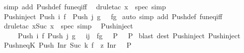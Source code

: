 \begin{isabellebody}
\isamarkupfalse%
\ {\isacharparenleft}simp\ add{\isacharcolon}\ Push{\isacharunderscore}def\ fun{\isacharunderscore}eq{\isacharunderscore}iff{\isacharparenright}\ \isanewline
{}\isamarkupfalse%
\ {\isacharparenleft}drule{\isacharunderscore}tac\ x{\isacharequal}{}\ \ spec{\isacharcomma}\ simp{\isacharparenright}\ \isanewline
{}\isamarkupfalse%
%
\endisatagproof
{\isafoldproof}%
%
\isadelimproof
\isanewline
%
\endisadelimproof
\isanewline
{}\isamarkupfalse%
\ Push{\isacharunderscore}inject{}{\isacharcolon}\ {\isachardoublequoteopen}Push\ i\ f\ {\isacharequal}\ Push\ j\ g\ \ {\isacharequal}{\isacharequal}{\isachargreater}\ f{\isacharequal}g{\isachardoublequoteclose}\isanewline
%
\isadelimproof
%
\endisadelimproof
%
\isatagproof
{}\isamarkupfalse%
\ {\isacharparenleft}auto\ simp\ add{\isacharcolon}\ Push{\isacharunderscore}def\ fun{\isacharunderscore}eq{\isacharunderscore}iff{\isacharparenright}\ \isanewline
{}\isamarkupfalse%
\ {\isacharparenleft}drule{\isacharunderscore}tac\ x{\isacharequal}{\isachardoublequoteopen}Suc\ x{\isachardoublequoteclose}\ \ spec{\isacharcomma}\ simp{\isacharparenright}\ \isanewline
{}\isamarkupfalse%
%
\endisatagproof
{\isafoldproof}%
%
\isadelimproof
\isanewline
%
\endisadelimproof
\isanewline
{}\isamarkupfalse%
\ Push{\isacharunderscore}inject{\isacharcolon}\isanewline
\ \ \ \ {\isachardoublequoteopen}{\isacharbrackleft}{\isacharbar}\ Push\ i\ f\ {\isacharequal}Push\ j\ g{\isacharsemicolon}\ \ {\isacharbrackleft}{\isacharbar}\ i{\isacharequal}j{\isacharsemicolon}\ \ f{\isacharequal}g\ {\isacharbar}{\isacharbrackright}\ {\isacharequal}{\isacharequal}{\isachargreater}\ P\ {\isacharbar}{\isacharbrackright}\ {\isacharequal}{\isacharequal}{\isachargreater}\ P{\isachardoublequoteclose}\isanewline
%
\isadelimproof
%
\endisadelimproof
%
\isatagproof
{}\isamarkupfalse%
\ {\isacharparenleft}blast\ dest{\isacharcolon}\ Push{\isacharunderscore}inject{}\ Push{\isacharunderscore}inject{}{\isacharparenright}%
\endisatagproof
{\isafoldproof}%
%
\isadelimproof
\ \isanewline
%
\endisadelimproof
\isanewline
{}\isamarkupfalse%
\ Push{\isacharunderscore}neq{\isacharunderscore}K{}{\isacharcolon}\ {\isachardoublequoteopen}Push\ {\isacharparenleft}Inr\ {\isacharparenleft}Suc\ k{\isacharparenright}{\isacharparenright}\ f\ {\isacharequal}\ {\isacharparenleft}{\isacharpercent}z{\isachardot}\ Inr\ {}{\isacharparenright}\ {\isacharequal}{\isacharequal}{\isachargreater}\ P{\isachardoublequoteclose}\isanewline

\end{isabellebody}
